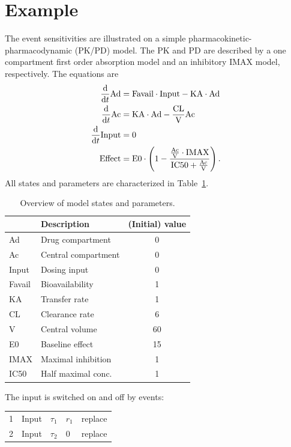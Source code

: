 \documentclass[journal, a4paper]{IEEEtran}
\begin{document}
\section{Example}

The event sensitivities are illustrated on a simple pharmacokinetic-pharmacodynamic (PK/PD) model. The PK and PD are described by a one compartment first order absorption model and an inhibitory IMAX model, respectively. The equations are
\begin{align}
  \frac{\rm d}{{\rm d}t}{\rm Ad} &= {\rm Favail}\cdot{\rm Input}-{\rm KA}\cdot{\rm Ad} \label{eq:ODE_1} \\ 
  \frac{\rm d}{{\rm d}t}{\rm Ac} &= {\rm KA}\cdot{\rm Ad}-\frac{\rm CL}{\rm V}{\rm Ac}\\
  \frac{\rm d}{{\rm d}t}{\rm Input} &= 0 \label{eq:ODE_3} \\
  {\rm Effect} &= {\rm E0}\cdot\left(1-\frac{\frac{\rm Ac}{\rm V}\cdot{\rm IMAX}}{{\rm IC50}+\frac{\rm Ac}{\rm V}}\right).\label{eq:effect}
\end{align}
All states and parameters are characterized in Table~\ref{tab:parameters}. 
\begin{table}[hb]
    \caption{Overview of model states and parameters.}
    \centering
    \begin{tabular}{l|l|c}
           & Description & (Initial) value \\
           \hline\hline
        Ad & Drug compartment & 0 \\
        Ac & Central compartment & 0\\
        Input & Dosing input & 0\\
        \hline
        Favail & Bioavailability & 1\\
        KA & Transfer rate & 1\\
        CL & Clearance rate & 6\\
        V & Central volume & 60\\
        E0 & Baseline effect & 15\\
        IMAX & Maximal inhibition & 1\\
        IC50 & Half maximal conc. & 1\\
        \hline
    \end{tabular}
    \label{tab:parameters}
\end{table}
The input is switched on and off by events:
\begin{center}
\begin{tabular}{|r|l|l|l|l|}\hline
     1 & Input & $\tau_1$ & $r_1$ & replace \\
     2 & Input & $\tau_2$ & 0 & replace\\
     \hline
\end{tabular}
\end{center}
\end{document}
